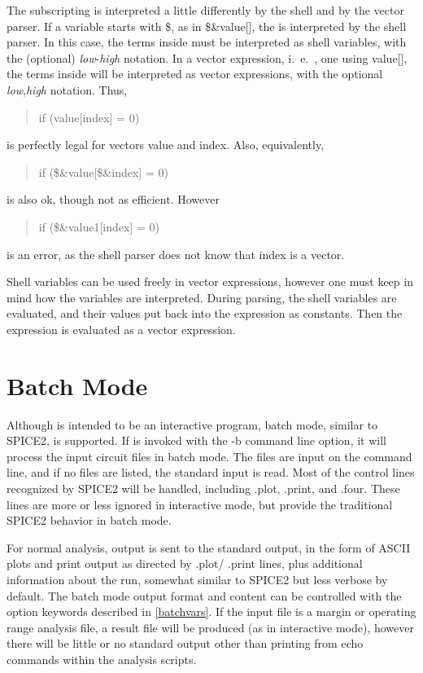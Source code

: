 The {\vt []} subscripting is interpreted a little differently by the
shell and by the vector parser.  If a variable starts with {\vt \$},
as in {\vt \$\&value[]}, the {\vt []} is interpreted by the shell
parser.  In this case, the terms inside {\vt []} must be interpreted
as shell variables, with the (optional) {\it low\/}-{\it high}
notation.  In a vector expression, i.~e.~, one using {\vt value[]},
the terms inside {\vt []} will be interpreted as vector expressions,
with the optional {\it low\/},{\it high} notation.  Thus,
\begin{quote}\vt
if (value[index] = 0)
\end{quote}
is perfectly legal for vectors {\vt value} and {\vt index}.  Also,
equivalently,
\begin{quote}\vt
if (\$\&value[\$\&index] = 0)
\end{quote}
is also ok, though not as efficient.  However
\begin{quote}\vt
if (\$\&value1[index] = 0)
\end{quote}
is an error, as the shell parser does not know that {\vt index} is a
vector.

Shell variables can be used freely in vector expressions, however
one must keep in mind how the variables are interpreted.  During
parsing, the shell variables are evaluated, and their values put
back into the expression as constants.  Then the expression is
evaluated as a vector expression. 


\section{Batch Mode}


Although {\WRspice} is intended to be an interactive program, batch
mode, similar to SPICE2, is supported.  If {\WRspice} is invoked with
the {\vt -b} command line option, it will process the input circuit
files in batch mode.  The files are input on the command line, and if
no files are listed, the standard input is read.  Most of the control
lines recognized by SPICE2 will be handled, including {\vt .plot},
{\vt .print}, and {\vt .four}.  These lines are more or less ignored
in interactive mode, but provide the traditional SPICE2 behavior in
batch mode.

For normal analysis, output is sent to the standard output, in the
form of ASCII plots and print output as directed by {\vt .plot}/{\vt
.print} lines, plus additional information about the run, somewhat
similar to SPICE2 but less verbose by default.  The batch mode output
format and content can be controlled with the option keywords
described in \ref{batchvars}.  If the input file is a margin or
operating range analysis file, a result file will be produced (as in
interactive mode), however there will be little or no standard output
other than printing from {\cb echo} commands within the analysis
scripts.

